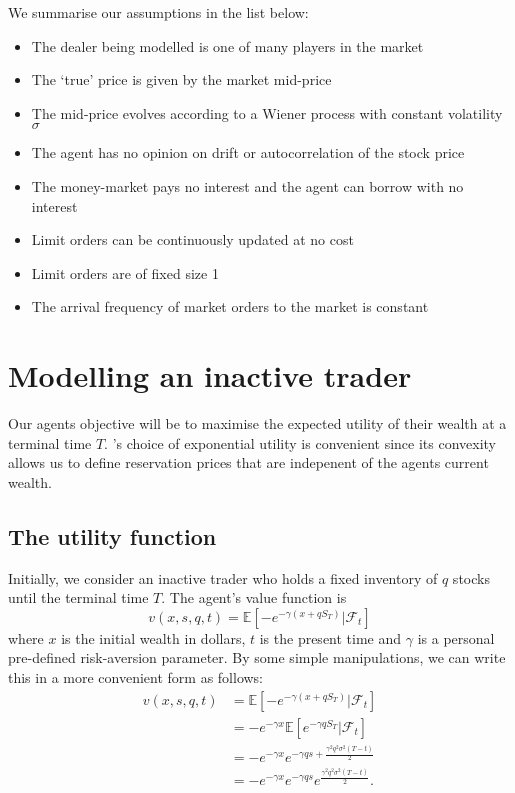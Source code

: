 We summarise our assumptions in the list below:

\begin{itemize}
    \item The dealer being modelled is one of many players in the market
    \item The `true' price is given by the market mid-price
    \item The mid-price evolves according to a Wiener process with constant volatility $\sigma$
    \item The agent has no opinion on drift or autocorrelation of the stock price
    \item The money-market pays no interest and the agent can borrow with no interest
    \item Limit orders can be continuously updated at no cost
    \item Limit orders are of fixed size 1
    \item The arrival frequency of market orders to the market is constant
\end{itemize}

\section{Modelling an inactive trader}\label{sec:3.3}

Our agents objective will be to maximise the expected utility of their wealth at 
a terminal time $T$. \textcite{AS2008}'s choice of exponential utility is 
convenient since its convexity allows us to define reservation prices that are 
indepenent of the agents current wealth.

\subsection*{The utility function}

Initially, we consider an inactive trader who holds a fixed inventory of $q$ stocks 
until the terminal time $T.$ The agent's value function is
\begin{equation}\label{eq:3.1}
    v(x,s,q,t)=\mathbb{E}\left[-e^{-\gamma(x+qS_T)}|\mathcal{F}_t\right]
\end{equation}
where $x$ is the initial wealth in dollars, $t$ is the present time and $\gamma$ is 
a personal pre-defined risk-aversion parameter. By some simple manipulations, we can 
write this in a more convenient form as follows:
\begin{align*}
    v(x,s,q,t)&=\mathbb{E}\left[-e^{-\gamma(x+qS_T)}|\mathcal{F}_t\right]\\
    &=-e^{-\gamma x}\mathbb{E}\left[e^{-\gamma q S_T}|\mathcal{F}_t\right]\\
    &=-e^{-\gamma x}e^{-\gamma q s + \frac{\gamma^2q^2\sigma^2(T-t)}{2}}\\
    &=-e^{-\gamma x}e^{-\gamma q s}e^{\frac{\gamma^2q^2\sigma^2(T-t)}{2}}.
\end{align*}

